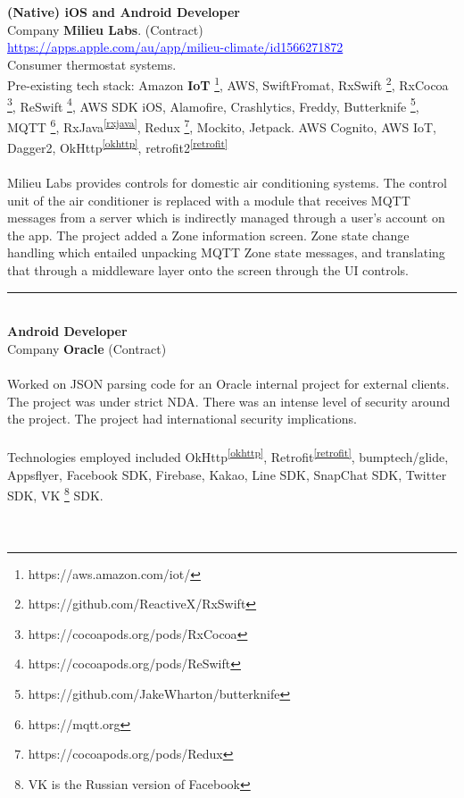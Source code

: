 \documentclass{article}
\let\svthefootnote\thefootnote
\newcommand\Cfootnote[2][black]{\def\thefootnote{\color{#1}\svthefootnote}%
  \footnote{\color{#1}#2}}
\begin{document}
\textbf{ (Native) iOS and Android Developer  }  \\
Company  \textbf {Milieu Labs}. (Contract)  \\
\textcolor{blue} { \underline{  https://apps.apple.com/au/app/milieu-climate/id1566271872   } }  \\


Consumer thermostat systems. \\

Pre-existing tech stack: Amazon \textbf {IoT} \Cfootnote[blue]{https://aws.amazon.com/iot/}, AWS, 
SwiftFromat, RxSwift\Cfootnote[blue]{https://github.com/ReactiveX/RxSwift}, RxCocoa\Cfootnote[blue]{https://cocoapods.org/pods/RxCocoa}, ReSwift\Cfootnote[blue]{https://cocoapods.org/pods/ReSwift},  AWS SDK iOS, Alamofire, Crashlytics, Freddy,
Butterknife\Cfootnote[blue]{https://github.com/JakeWharton/butterknife}, MQTT\Cfootnote[blue]{https://mqtt.org}, RxJava\textsuperscript{\ref{rxjava}}, Redux\Cfootnote[blue]{https://cocoapods.org/pods/Redux}, Mockito, Jetpack. 
AWS Cognito, AWS IoT, Dagger2, OkHttp\textsuperscript{\ref{okhttp}}, retrofit2\textsuperscript{\ref{retrofit}}  \\
\\

Milieu Labs provides controls for domestic air conditioning systems. The control unit of the air conditioner is replaced with a module that receives MQTT messages from a server which is indirectly managed through a user's account on the app. 
The project added a Zone information screen. Zone state change handling which entailed unpacking MQTT Zone state messages, and translating that through a middleware layer onto the screen through the UI controls. \\

\noindent\hfil\rule{0.5\textwidth}{.4pt}\hfil
\\

\textbf{  Android  Developer } \\
Company  \textbf {Oracle} (Contract) \\
\\
Worked on JSON parsing code for an Oracle internal project for external clients. \\
The project was under strict NDA. There was an intense level of security around the project. The project had international security implications.  \\
\\
Technologies employed included OkHttp\textsuperscript{\ref{okhttp}}, Retrofit\textsuperscript{\ref{retrofit}}, bumptech/glide, Appsflyer, Facebook SDK, Firebase, Kakao, Line SDK, SnapChat SDK, Twitter SDK, VK\Cfootnote[blue]{VK is the Russian version of Facebook} SDK. \\
\\
\\
\end{document}
